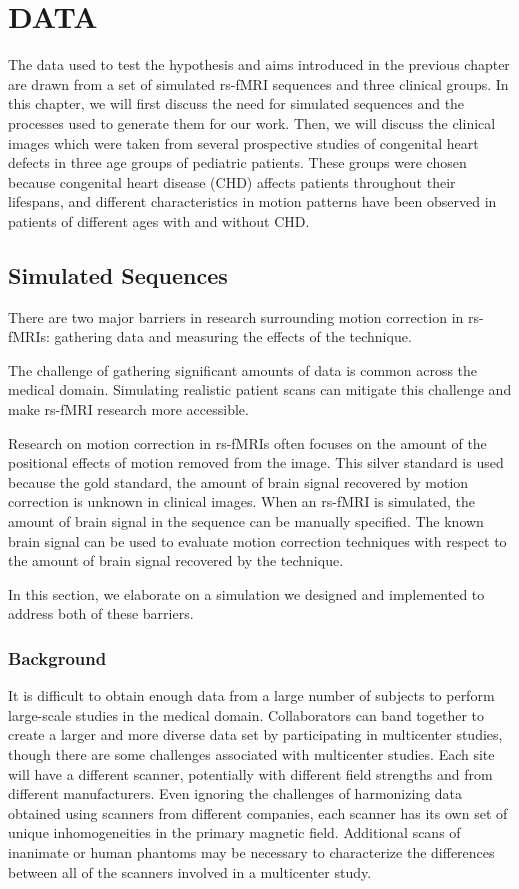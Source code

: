 \chapter{DATA}
\label{ch:data}

The data used to test the hypothesis and aims introduced in the previous chapter are drawn from a set of simulated rs-fMRI sequences and three clinical groups. In this chapter, we will first discuss the need for simulated sequences and the processes used to generate them for our work. Then, we will discuss the clinical images which were taken from several prospective studies of congenital heart defects in three age groups of pediatric patients. These groups were chosen because congenital heart disease (CHD) affects patients throughout their lifespans, and different characteristics in motion patterns have been observed in patients of different ages with and without CHD.

\section{Simulated Sequences} 

There are two major barriers in research surrounding motion correction in rs-fMRIs: gathering data and measuring the effects of the technique. 

The challenge of gathering significant amounts of data is common across the medical domain. Simulating realistic patient scans can mitigate this challenge and make rs-fMRI research more accessible. 

Research on motion correction in rs-fMRIs often focuses on the amount of the positional effects of motion removed from the image. This silver standard is used because the gold standard, the amount of brain signal recovered by motion correction is unknown in clinical images. When an rs-fMRI is simulated, the amount of brain signal in the sequence can be manually specified. The known brain signal can be used to evaluate motion correction techniques with respect to the amount of brain signal recovered by the technique.

In this section, we elaborate on a simulation we designed and implemented to address both of these barriers.

\subsection{Background}

It is difficult to obtain enough data from a large number of subjects to perform large-scale studies in the medical domain. Collaborators can band together to create a larger and more diverse data set by participating in multicenter studies, though there are some challenges associated with multicenter studies. Each site will have a different scanner, potentially with different field strengths and from different manufacturers. Even ignoring the challenges of harmonizing data obtained using scanners from different companies, each scanner has its own set of unique inhomogeneities in the primary magnetic field. Additional scans of inanimate or human phantoms may be necessary to characterize the differences between all of the scanners involved in a multicenter study.


